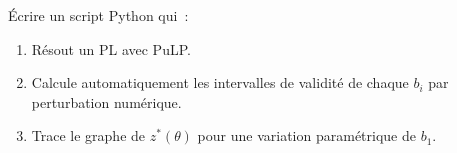 \begin{exercice}
\'Ecrire un script Python qui~:
\begin{enumerate}
  \item R\'esout un PL avec PuLP.
  \item Calcule automatiquement les intervalles de validit\'e de chaque $b_i$
        par perturbation num\'erique.
  \item Trace le graphe de $z^*(\theta)$ pour une variation param\'etrique
        de $b_1$.
\end{enumerate}
\end{exercice}
